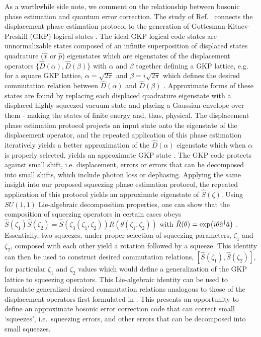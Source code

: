 {As a worthwhile side note, we {comment on the relationship between} bosonic phase estimation and quantum error correction. The study of Ref.~\cite{PhaseEstimationTerhal1} connects the displacement phase estimation protocol to the generation of Gottesman-Kitaev-Preskill (GKP) logical states \cite{GKPPaper2001}. The ideal GKP logical code states are unnormalizable states composed of an infinite superposition of displaced states quadrature ($\hat{x}$ or $\hat{p}$) eigenstates which are eigenstates of the displacement operators $\{\hat{D}(\alpha),\hat{D}(\beta)\}$ with $\alpha$ and $\beta$ together defining a GKP lattice, e.g. for a square GKP lattice, $\alpha=\sqrt{2\pi}$ and $\beta=i\sqrt{2\pi}$ which defines the desired commutation relation between $\hat{D}(\alpha)$ and $\hat{D}(\beta)$ \cite{GKPPaper2001}. Approximate forms of these states are found by replacing each displaced quadrature eigenstate with a displaced highly squeezed vacuum state and placing a Gaussian envelope over them - making the states of finite energy and, thus, physical. The displacement phase estimation protocol projects an input state onto the eigenstate of the displacement operator, and the repeated application of this phase estimation iteratively yields a better approximation of the $\hat{D}(\alpha)$ eigenstate which when $\alpha$ is properly selected, yields an approximate GKP state \cite{PhaseEstimationTerhal1,PhaseEstimationTerhal2}. The GKP code protects against small shift, i.e. displacement, errors or errors that can be decomposed into small shifts, {which include photon loss or dephasing}.  Applying the same insight into our proposed squeezing phase estimation protocol, the repeated application of this protocol yields an approximate eigenstate of $\hat{S}(\zeta)$. Using $SU(1,1)$ Lie-algebraic decomposition properties, one can show that the composition of squeezing operators in certain cases obeys $\hat{S}(\zeta_1)\hat{S}(\zeta_2)=\hat{S}(\zeta_3(\zeta_1,\zeta_2))\hat{R}(\theta(\zeta_1,\zeta_2)) $ with $\hat{R}(\theta)=\exp(i\theta\hat{a}^\dagger\hat{a})$ \cite{SU11Decomposition}. Essentially, two squeezes, under proper selection of squeezing parameters, $\zeta_1$ and $\zeta_2$, composed with each other yield a rotation followed by a squeeze. This identity can then be used to construct desired commutation relations, $[\hat{S}(\zeta_1),\hat{S}(\zeta_2)]$, for particular $\zeta_1$ and $\zeta_2$ values which would define a generalization of the GKP lattice to squeezing operators.  This Lie-algebraic identity can be used to formulate generalized desired commutation relations analogous to those of the displacement operators first formulated in \cite{GKPPaper2001}. This presents an opportunity to define an approximate bosonic error correction code that can correct small `squeezes', i.e.~squeezing errors, and other errors that can be decomposed into small squeezes. }


